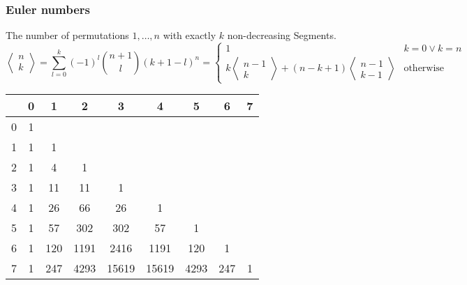 \subsubsection{Euler numbers}

The number of permutations $1,\ldots, n$ with exactly $k$
non-decreasing Segments.
\begin{equation*}
  \left\langle
    \begin{matrix}
      n\\k
    \end{matrix}
\right\rangle = \sum\limits_{l = 0}^k(-1)^l \binom{n + 1}{l}(k + 1 - l)^n
  =
  \begin{cases}
    1 & k = 0 \lor k = n\\
    k \left\langle
      \begin{smallmatrix}
        n - 1\\k
      \end{smallmatrix}
\right\rangle + (n - k + 1) \left\langle
  \begin{smallmatrix}
    n - 1\\k - 1
  \end{smallmatrix}
\right\rangle & \text{otherwise}
  \end{cases}
\end{equation*}

\begin{center}
	\begin{tabular}{ |l||c|c|c|c|c|c|c|c| } 
		\hline
		\diagbox{$n$}{$k$} & 0 & 1 & 2 & 3 & 4 & 5 & 6 & 7  \\
		\hline\hline
		0 &  1 &     &      &       &        &       &      &    \\
		1 &  1 & 1   &      &       &        &       &      &    \\
		2 &  1 & 4   & 1    &       &        &       &      &    \\
		3 &  1 & 11  & 11   & 1     &        &       &      &    \\
		4 &  1 & 26  & 66   & 26    & 1      &       &      &    \\
		5 &  1 & 57  & 302  & 302   & 57     & 1     &      &    \\
		6 &  1 & 120 & 1191 & 2416  & 1191   & 120   & 1    &    \\
		7 &  1 & 247 & 4293 & 15619 & 15619  & 4293  & 247  & 1  \\
		\hline
	\end{tabular}
\end{center}


